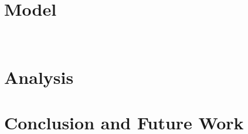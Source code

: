 \documentclass{article}
\begin{document}
\cite{power2018cooperation,power2018}

\cite{koster2019,koster2014,koster2015,bogerhoff2015}

\cite{smith2019,nolin2012}



~\cite{ch1as_hdbk,hedstrom2011oxford,martin_lee}

~\cite{ch2as_hdbk,ch11as_hdbk,granovetter2005,hedstrom2018}


\section{Model}
~\cite{redner2001guide}
\section{Analysis}

\section{Conclusion and Future Work}

\end{document}
